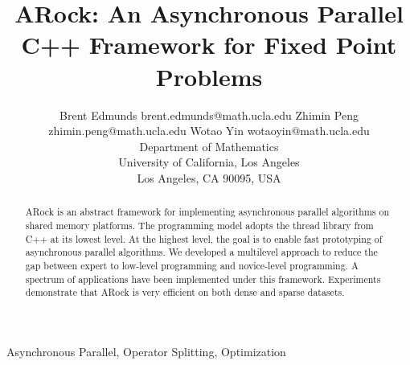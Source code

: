 \documentclass[twoside,11pt]{article}
\begin{document}
\title{ARock: An Asynchronous Parallel C++ Framework for Fixed Point Problems}

\author{\name Brent Edmunds \email  brent.edmunds@math.ucla.edu
       \AND
       \name Zhimin Peng \email zhimin.peng@math.ucla.edu
       \AND
	\name Wotao Yin \email wotaoyin@math.ucla.edu\\
       \addr Department of Mathematics\\
       University of California, Los Angeles\\
       Los Angeles, CA 90095, USA}	

\maketitle

\begin{abstract}
ARock is an abstract framework for implementing asynchronous parallel algorithms on shared memory platforms. 
The programming model adopts the thread library from C++ at its lowest level. At the highest level, the goal is to enable fast prototyping of asynchronous parallel algorithms. 
We developed a multilevel approach to reduce the gap between expert to low-level programming and novice-level programming. 
A spectrum of applications have been implemented under this framework. 
Experiments demonstrate that ARock is very efficient on both dense and sparse datasets. 
\end{abstract}

\begin{keywords}
  Asynchronous Parallel, Operator Splitting, Optimization
\end{keywords}








%

%

%


% 














\end{document}
